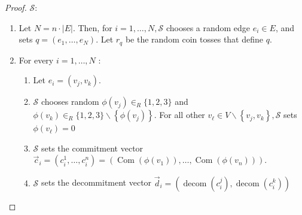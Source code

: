 \documentclass{beamer}
\begin{document}
    \begin{frame}
        \frametitle{}
        
        \begin{proof}
            $\mathcal{S}$:
            \begin{enumerate}
                \item Let $N=n \cdot|E| .$ Then, for $i=1, \ldots, N, \mathcal{S}$ chooses a random edge $e_{i} \in E$, and sets $q=\left(e_{1}, \ldots, e_{N}\right)$. Let $r_{q}$ be the random coin tosses that define $q$.
                \item For every $i=1, \ldots, N$ :
                \begin{enumerate}[a]
                    \item Let $e_{i}=\left(v_{j}, v_{k}\right)$.
                    \item $\mathcal{S}$ chooses random $\phi\left(v_{j}\right) \in_{R}\{1,2,3\}$ and $\phi\left(v_{k}\right) \in_{R}\{1,2,3\} \backslash\left\{\phi\left(v_{j}\right)\right\}$. For all other
                    $v_{\ell} \in V \backslash\left\{v_{j}, v_{k}\right\}, \mathcal{S}$ sets $\phi\left(v_{\ell}\right)=0$
                    \item $\mathcal{S}$ sets the commitment vector $\vec{c}_{i}=\left(c_{i}^{1}, \ldots, c_{i}^{n}\right)=\left(\operatorname{Com}\left(\phi\left(v_{1}\right)\right), \ldots, \operatorname{Com}\left(\phi\left(v_{n}\right)\right)\right)$.
                    \item $\mathcal{S}$ sets the decommitment vector $\vec{d}_{i}=\left(\operatorname{decom}\left(c_{i}^{j}\right),\operatorname{decom}\left(c_{i}^{k}\right)\right)$
                \end{enumerate}
            \end{enumerate}
        \end{proof}
    
        
    
    \end{frame}
\end{document}
